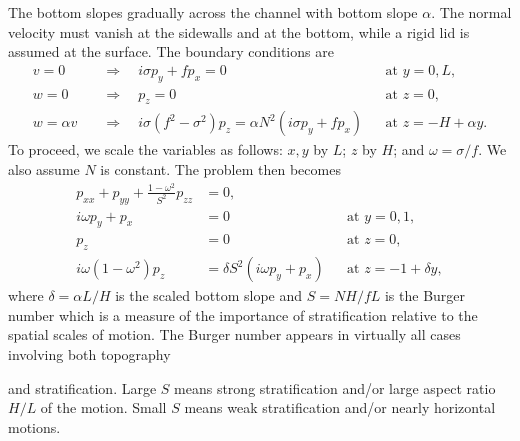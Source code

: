 The bottom slopes gradually across the channel with bottom slope $\alpha$. The normal
velocity must vanish at the sidewalls and at the bottom, while a rigid lid is assumed at
the surface. The boundary conditions are
\begin{align*}
	v=0        & \quad\Rightarrow\quad i\sigma p_y+fp_x=0
	           &                                          & \text{at }y=0,L,         \\
	w=0        & \quad\Rightarrow\quad p_z=0
	           &                                          & \text{at }z=0,           \\
	w=\alpha v & \quad\Rightarrow\quad
	i\sigma(f^2-\sigma^2)p_z
	=\alpha N^2(i\sigma p_y+fp_x)
	           &                                          & \text{at }z=-H+\alpha y.
\end{align*}
To proceed, we scale the variables as follows: $x,y$ by $L$; $z$ by $H$; and
$\omega=\sigma/f$. We also assume $N$ is constant. The problem then becomes
\begin{align*}
	p_{xx}+p_{yy}+\frac{1-\omega^2}{S^2}p_{zz} & =0,                                                                        \\
	i\omega p_y+p_x                            & =0                           &                          & \text{at }y=0,1, \\
	p_z                                        & =0                           &                          & \text{at }z=0,   \\
	i\omega(1-\omega^2)p_z
	                                           & =\delta S^2(i\omega p_y+p_x)
	                                           &                              & \text{at }z=-1+\delta y,
\end{align*}
where $\delta=\alpha L/H$ is the scaled bottom slope and $S=NH/fL$ is the Burger
number which is a measure of the importance of stratification relative to the spatial
scales of motion. The Burger number appears in virtually all cases involving both
topography

\sourcepagebreak

and stratification. Large $S$ means strong stratification and/or large aspect ratio
$H/L$ of the motion. Small $S$ means weak stratification and/or nearly horizontal
motions.

